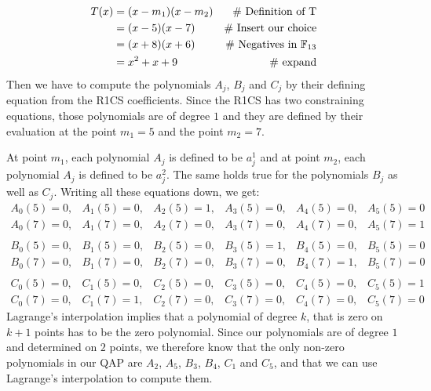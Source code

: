 \begin{example}
\begin{align*}
T(x) & = (x-m_1)(x-m_2) & \text{\# Definition of T}\\
     & = (x-5)(x-7)  & \text{\# Insert our choice}\\
     & = (x+8)(x+6)  & \text{\# Negatives in } \mathbb{F}_{13}\\
     & = x^2 + x +9 & \text{\# expand}
\end{align*}
Then we have to compute the polynomials $A_j$, $B_j$ and $C_j$ by their defining equation from the R1CS coefficients. Since the R1CS has two constraining equations, those polynomials are of degree $1$ and they are defined by their evaluation at the point $m_1=5$ and the point $m_2=7$. 

At point $m_1$, each polynomial $A_j$ is defined to be $a_j^1$ and at point $m_2$, each polynomial $A_j$ is defined to be $a_j^2$. The same holds true for the polynomials $B_j$ as well as $C_j$. Writing all these equations down, we get:
$$
\begin{array}{llllll}
A_0(5)=0, & A_1(5)=0, & A_2(5)=1, & A_3(5)=0, & A_4(5)=0, & A_5(5)=0 \\
A_0(7)=0, & A_1(7)=0, & A_2(7)=0, & A_3(7)=0, & A_4(7)=0, & A_5(7)=1\\
\\
B_0(5)=0, & B_1(5)=0, & B_2(5)=0, & B_3(5)=1, & B_4(5)=0, & B_5(5)=0 \\
B_0(7)=0, & B_1(7)=0, & B_2(7)=0, & B_3(7)=0, & B_4(7)=1, & B_5(7)=0\\
\\
C_0(5)=0, & C_1(5)=0, & C_2(5)=0, & C_3(5)=0, & C_4(5)=0, & C_5(5)=1 \\
C_0(7)=0, & C_1(7)=1, & C_2(7)=0, & C_3(7)=0, & C_4(7)=0, & C_5(7)=0
\end{array}
$$
Lagrange's interpolation implies that a polynomial of degree $k$, that is zero on $k+1$ points has to be the zero polynomial. Since our polynomials are of degree $1$ and determined on $2$ points, we therefore know that the only non-zero polynomials in our QAP are $A_2$, $A_5$, $B_3$, $B_4$, $C_1$ and $C_5$, and that we can use Lagrange's interpolation to compute them. 


\end{example}

